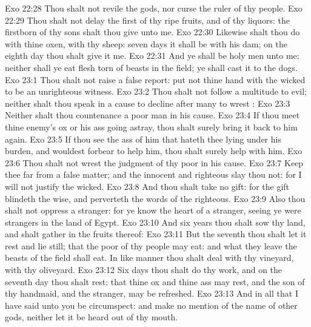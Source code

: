 \vs Exo 22:28 Thou shalt not revile the gods, nor curse the ruler of thy people.
\vs Exo 22:29 Thou shalt not delay  the first of thy ripe fruits, and of thy liquors: the firstborn of thy sons shalt thou give unto me.
\vs Exo 22:30 Likewise shalt thou do with thine oxen,  with thy sheep: seven days it shall be with his dam; on the eighth day thou shalt give it me.
\vs Exo 22:31 And ye shall be holy men unto me: neither shall ye eat  flesh  torn of beasts in the field; ye shall cast it to the dogs.
\vs Exo 23:1 Thou shalt not raise a false report: put not thine hand with the wicked to be an unrighteous witness.
\vs Exo 23:2 Thou shalt not follow a multitude to  evil; neither shalt thou speak in a cause to decline after many to wrest :
\vs Exo 23:3 Neither shalt thou countenance a poor man in his cause.
\vs Exo 23:4 If thou meet thine enemy's ox or his ass going astray, thou shalt surely bring it back to him again.
\vs Exo 23:5 If thou see the ass of him that hateth thee lying under his burden, and wouldest forbear to help him, thou shalt surely help with him.
\vs Exo 23:6 Thou shalt not wrest the judgment of thy poor in his cause.
\vs Exo 23:7 Keep thee far from a false matter; and the innocent and righteous slay thou not: for I will not justify the wicked.
\vs Exo 23:8 And thou shalt take no gift: for the gift blindeth the wise, and perverteth the words of the righteous.
\vs Exo 23:9 Also thou shalt not oppress a stranger: for ye know the heart of a stranger, seeing ye were strangers in the land of Egypt.
\vs Exo 23:10 And six years thou shalt sow thy land, and shalt gather in the fruits thereof:
\vs Exo 23:11 But the seventh  thou shalt let it rest and lie still; that the poor of thy people may eat: and what they leave the beasts of the field shall eat. In like manner thou shalt deal with thy vineyard,  with thy oliveyard.
\vs Exo 23:12 Six days thou shalt do thy work, and on the seventh day thou shalt rest: that thine ox and thine ass may rest, and the son of thy handmaid, and the stranger, may be refreshed.
\vs Exo 23:13 And in all  that I have said unto you be circumspect: and make no mention of the name of other gods, neither let it be heard out of thy mouth.
